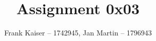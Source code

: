 \documentclass{article}
\begin{document}
\title{Assignment 0x03}
\author{Frank Kaiser -- 1742945, Jan Martin -- 1796943}

\maketitle

\tableofcontents




\end{document}
